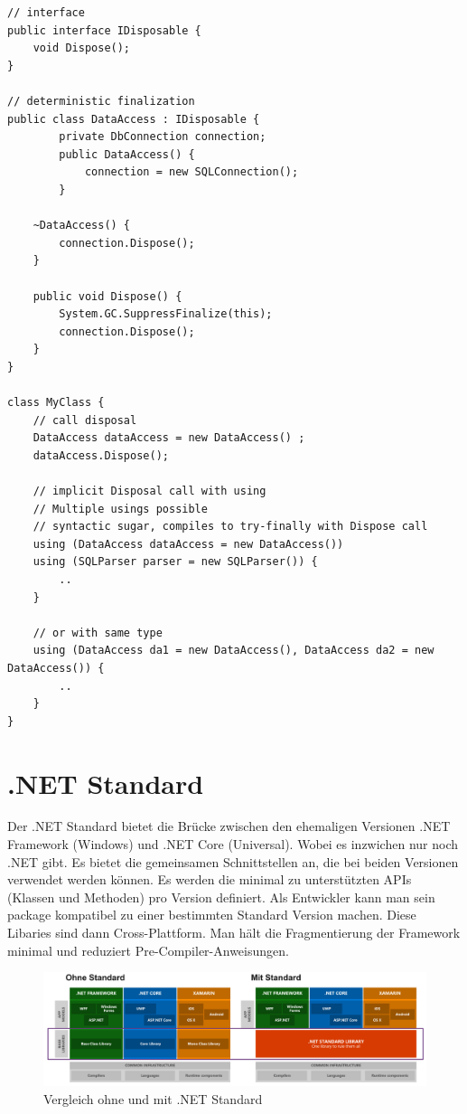 \documentclass[
a4paper,
oneside,
10pt,
fleqn,
headsepline,
toc=listofnumbered, 
bibliography=totocnumbered]{scrartcl}
\let\stdsection\section
\renewcommand\section{\clearpage\stdsection}
\begin{document}
\begin{lstlisting}
// interface
public interface IDisposable {
	void Dispose();
}
	
// deterministic finalization
public class DataAccess : IDisposable {
		private DbConnection connection;
		public DataAccess() {
			connection = new SQLConnection();
		}
	
	~DataAccess() {
		connection.Dispose();
	}
	
	public void Dispose() {
		System.GC.SuppressFinalize(this);
		connection.Dispose();
	}
}

class MyClass {
	// call disposal
	DataAccess dataAccess = new DataAccess() ;
	dataAccess.Dispose();
	
	// implicit Disposal call with using
	// Multiple usings possible
	// syntactic sugar, compiles to try-finally with Dispose call
	using (DataAccess dataAccess = new DataAccess())
	using (SQLParser parser = new SQLParser()) {
		..
	}
	
	// or with same type
	using (DataAccess da1 = new DataAccess(), DataAccess da2 = new DataAccess()) {
		..
	}
}
\end{lstlisting}

\section{.NET Standard}
Der .NET Standard bietet die Brücke zwischen den ehemaligen Versionen .NET Framework (Windows) und .NET Core (Universal). Wobei es inzwichen nur noch .NET gibt. Es bietet die gemeinsamen Schnittstellen an, die bei beiden Versionen verwendet werden können. Es werden die minimal zu unterstützten APIs (Klassen und Methoden) pro Version definiert. Als Entwickler kann man sein package kompatibel zu einer bestimmten Standard Version machen. Diese Libaries sind dann Cross-Plattform. Man hält die Fragmentierung der Framework minimal und reduziert Pre-Compiler-Anweisungen.

\begin{figure}[!ht]
	\centering
	\includegraphics[width=1\linewidth]{images/standard-vergleich}
	\caption{Vergleich ohne und mit .NET Standard}
	\label{fig:standardvergleich}
\end{figure}
\end{document}
